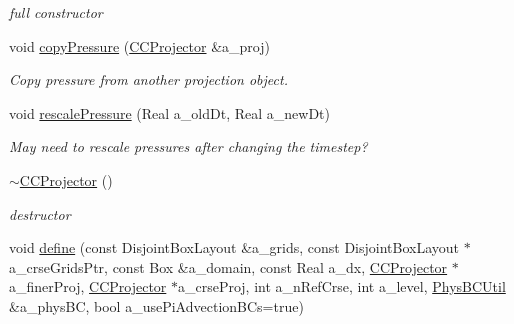 \begin{DoxyCompactItemize}
\begin{DoxyCompactList}\small\item\em full constructor \end{DoxyCompactList}\item 
\hypertarget{class_c_c_projector_a790b9f6f5afb6ef1f5ad271520cfe81b}{void \hyperlink{class_c_c_projector_a790b9f6f5afb6ef1f5ad271520cfe81b}{copy\-Pressure} (\hyperlink{class_c_c_projector}{C\-C\-Projector} \&a\-\_\-proj)}\label{class_c_c_projector_a790b9f6f5afb6ef1f5ad271520cfe81b}

\begin{DoxyCompactList}\small\item\em Copy pressure from another projection object. \end{DoxyCompactList}\item 
\hypertarget{class_c_c_projector_af83bdefcca4df21139b3ccd890eaef2f}{void \hyperlink{class_c_c_projector_af83bdefcca4df21139b3ccd890eaef2f}{rescale\-Pressure} (Real a\-\_\-old\-Dt, Real a\-\_\-new\-Dt)}\label{class_c_c_projector_af83bdefcca4df21139b3ccd890eaef2f}

\begin{DoxyCompactList}\small\item\em May need to rescale pressures after changing the timestep? \end{DoxyCompactList}\item 
\hypertarget{class_c_c_projector_a8aac47d884f711d95d65d198cf450879}{\hyperlink{class_c_c_projector_a8aac47d884f711d95d65d198cf450879}{$\sim$\-C\-C\-Projector} ()}\label{class_c_c_projector_a8aac47d884f711d95d65d198cf450879}

\begin{DoxyCompactList}\small\item\em destructor \end{DoxyCompactList}\item 
\hypertarget{class_c_c_projector_ab4a0aa3833b78d47b37d0f3f78adaa23}{void \hyperlink{class_c_c_projector_ab4a0aa3833b78d47b37d0f3f78adaa23}{define} (const Disjoint\-Box\-Layout \&a\-\_\-grids, const Disjoint\-Box\-Layout $\ast$a\-\_\-crse\-Grids\-Ptr, const Box \&a\-\_\-domain, const Real a\-\_\-dx, \hyperlink{class_c_c_projector}{C\-C\-Projector} $\ast$a\-\_\-finer\-Proj, \hyperlink{class_c_c_projector}{C\-C\-Projector} $\ast$a\-\_\-crse\-Proj, int a\-\_\-n\-Ref\-Crse, int a\-\_\-level, \hyperlink{class_phys_b_c_util}{Phys\-B\-C\-Util} \&a\-\_\-phys\-B\-C, bool a\-\_\-use\-Pi\-Advection\-B\-Cs=true)}\label{class_c_c_projector_ab4a0aa3833b78d47b37d0f3f78adaa23}


\end{DoxyCompactItemize}
